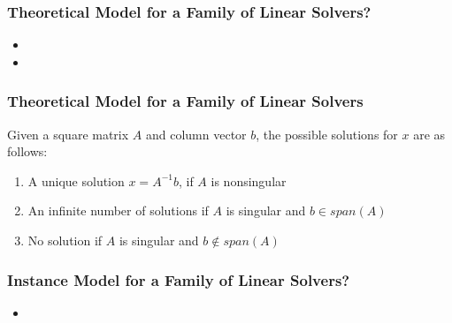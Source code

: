 \documentclass[t,12pt,numbers,fleqn]{beamer}
\begin{document}

\begin{frame}
\frametitle{Theoretical Model for a Family of Linear Solvers?}

\begin{itemize}
	
\item {}
\item {}
    
\end{itemize}

\end{frame}


\begin{frame}
\frametitle{Theoretical Model for a Family of Linear Solvers}

Given a square matrix $A$ and column vector $b$, the possible
solutions for $x$ are as follows:

\begin{enumerate}
\item A unique solution $x = A^{-1} b$, if $A$ is nonsingular
\item An infinite number of solutions if $A$ is singular and $b \in span(A)$
\item No solution if $A$ is singular and $b \notin span(A)$
\end{enumerate}

\cite{Anton1987}

\end{frame}


\begin{frame}
\frametitle{Instance Model for a Family of Linear Solvers?}

\begin{itemize}
	
\item {}
    
\end{itemize}


\end{frame}
\end{document}
